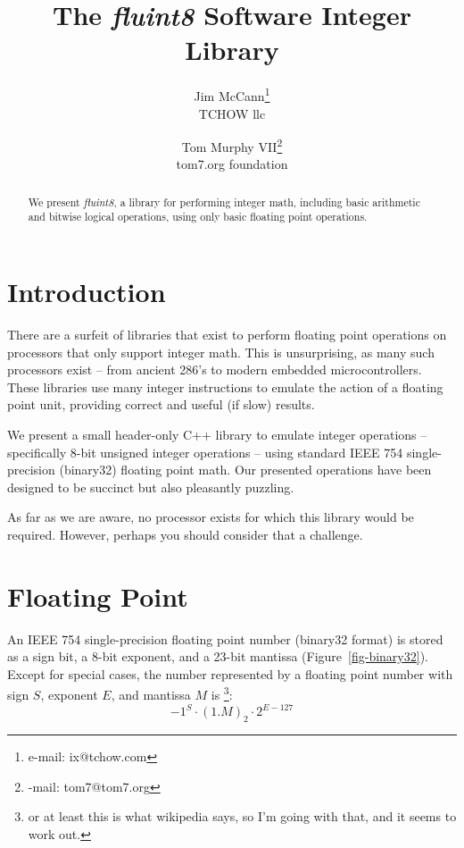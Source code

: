 \documentclass{acmsiggraph}
\title{The {\em fluint8} Software Integer Library}
\author{Jim McCann\thanks{e-mail: ix@tchow.com}\\
  TCHOW llc
  \and
  Tom Murphy VII\thanks{\protect \rotatebox[origin=c]{180}{e}-mail: tom7@tom7.org}\\
  tom7.org foundation}
\theoremstyle{remark}
\theoremstyle{definition}
\begin{document}
\maketitle

\begin{abstract}
We present {\em fluint8}, a library for performing integer math, including basic arithmetic and bitwise logical operations, using only basic floating point operations.
\end{abstract}

\begin{CRcatlist}
\end{CRcatlist}

\section{Introduction}
There are a surfeit of libraries that exist to perform floating point operations on processors that only support integer math.
This is unsurprising, as many such processors exist -- from ancient 286's to modern embedded microcontrollers.
These libraries use many integer instructions to emulate the action of a floating point unit, providing correct and useful (if slow) results.

We present a small header-only C++ library to emulate integer operations -- specifically 8-bit unsigned integer operations -- using standard IEEE 754 single-precision (binary32) floating point math.
Our presented operations have been designed to be succinct but also pleasantly puzzling.

As far as we are aware, no processor exists for which this library would be required.
However, perhaps you should consider that a challenge.

\section{Floating Point}
An IEEE 754 single-precision floating point number (binary32 format) is stored as a sign bit, a 8-bit exponent, and a 23-bit mantissa (Figure~\ref{fig-binary32}).
Except for special cases, the number represented by a floating point number with sign $S$, exponent $E$, and mantissa $M$ is
\footnote{or at least this is what wikipedia says, so I'm going with that, and it seems to work out.}:
\begin{displaymath}
-1^{S}\cdot (1.M)_2 \cdot 2^{E-127}
\end{displaymath}
\end{document}
